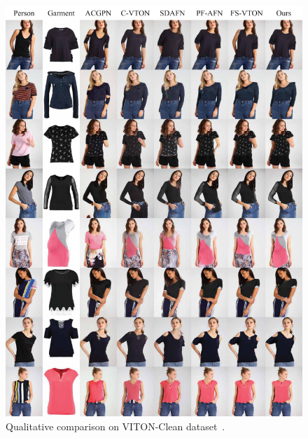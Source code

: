 \begin{figure}[h!]
  \centering
  \includegraphics[width=\linewidth]{content/resources/images/tryon/qualitative-viton.pdf}
  \caption{Qualitative comparison on VITON-Clean dataset~\cite{Han-CVPR2018-Viton}.}
  \label{fig:qualitative-viton}
  \vspace{-2mm}
\end{figure}

